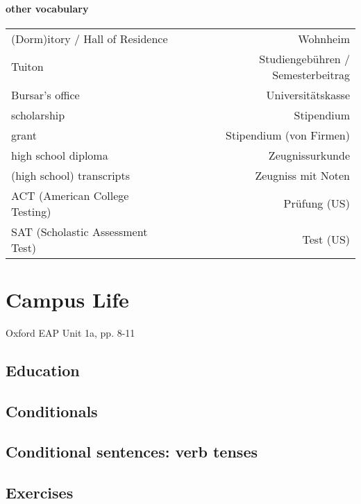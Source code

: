 \documentclass{scrreprt}
\begin{document}
\paragraph{other vocabulary} \parskp
\begin{tabular}{l	r}
(Dorm)itory / Hall of Residence & Wohnheim\\
Tuiton & Studiengebühren / Semesterbeitrag\\
Bursar's office & Universitätskasse\\
scholarship & Stipendium\\
grant & Stipendium (von Firmen)\\
high school diploma & Zeugnissurkunde \\
(high school) transcripts & Zeugniss mit Noten\\
ACT (American College Testing) & Prüfung (US)\\
SAT (Scholastic Assessment Test) & Test (US)
\end{tabular}
\section{Campus Life}
Oxford EAP Unit 1a, pp. 8-11
\subsection{Education}

\subsection{Conditionals}

\subsection{Conditional sentences: verb tenses}

\subsection{Exercises}


\end{document}
